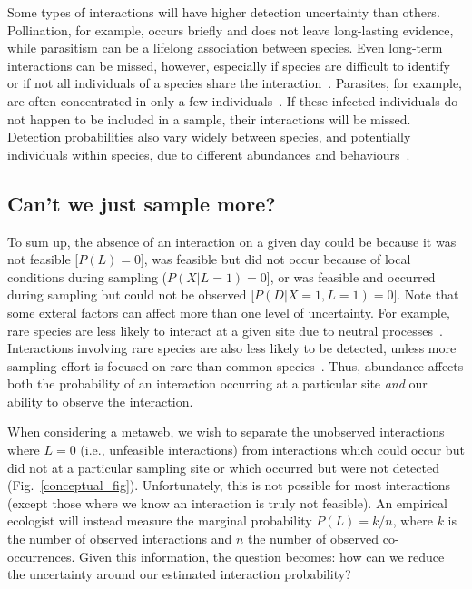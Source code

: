 \documentclass[12pt]{article}
\begin{document}
\begin{spacing}{2.0}
          Some types of interactions will have higher detection uncertainty than others. Pollination, for example, occurs briefly and does not leave long-lasting evidence, while parasitism can be a lifelong association between species. Even long-term interactions can be missed, however, especially if species are difficult to identify or if not all individuals of a species share the interaction~\citep{Wells2013,Cirtwill2016}. Parasites, for example, are often concentrated in only a few individuals~\citep{Lagrue2017}. If these infected individuals do not happen to be included in a sample, their interactions will be missed. Detection probabilities also vary widely between species, and potentially individuals within species, due to different abundances and behaviours~\citep{Wells2013,Weinstein2017}.


    \subsection*{Can't we just sample more?}

        To sum up, the absence of an interaction on a given day could  be because it was not feasible [$P(L) = 0$], was feasible but did not occur because of local conditions during sampling ($P(X|L=1) = 0$], or was feasible and occurred during sampling but could not be observed [$P(D|X=1,L=1)=0$]. Note that some exteral factors can affect more than one level of uncertainty. For example, rare species are less likely to interact at a given site due to neutral processes~\citep{Jordano2016,Graham2018}. Interactions involving rare species are also less likely to be detected, unless more sampling effort is focused on rare than common species~\citep{Bartomeus2013,Jordano2016}. Thus, abundance affects both the probability of an interaction occurring at a particular site \emph{and} our ability to observe the interaction. 


        When considering a metaweb, we wish to separate the unobserved interactions where $L = 0$ (i.e., unfeasible interactions) from interactions which could occur but did not at a particular sampling site or which occurred but were not detected (Fig.~\ref{conceptual_fig}). Unfortunately, this is not possible for most interactions (except those where we know an interaction is truly not feasible). An empirical ecologist will instead measure the marginal probability $P(L) = k/n$, where $k$ is the number of observed interactions and $n$ the number of observed co-occurrences. Given this information, the question becomes: how can we reduce the uncertainty around our estimated interaction probability?



\end{spacing}
\end{document}
